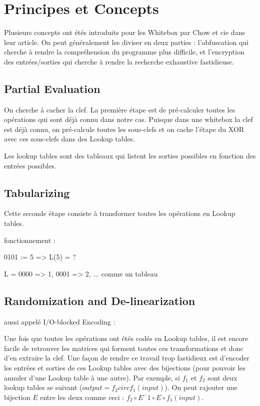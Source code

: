 \documentclass[a4paper,12pt]{article}
\begin{document}
\section{Principes et Concepts}

Plusieurs concepts ont étés introduits pour les Whitebox par Chow et cie dans leur article. On peut généralement les diviser en deux parties : l'obfuscation qui cherche à rendre la compréhension du programme plus difficile, et
 l'encryption des entrées/sorties qui cherche à rendre la recherche exhaustive fastidieuse.

\subsection{Partial Evaluation}

On cherche à cacher la clef. La première étape est de pré-calculer toutes les opérations qui sont déjà connu dans notre cas. Puisque dans une whitebox la clef est déjà connu, on pré-calcule toutes les sous-clefs et on cache l'étape du XOR avec ces sous-clefs dans des Lookup tables.

Les lookup tables sont des tableaux qui listent les sorties possibles en fonction des entrées possibles.

\subsection{Tabularizing}

Cette seconde étape consiste à transformer toutes les opérations en Lookup tables.

fonctionnement :

0101 := 5 => L(5) = ?

L = { 0000 => 1, 0001 => 2, ... } comme un tableau

\subsection{Randomization and De-linearization}

aussi appelé I/O-blocked Encoding :

Une fois que toutes les opérations ont étés codés en Lookup tables, il est encore facile de retrouver les matrices qui forment toutes ces transformations et donc d'en extraire la clef. Une façon de rendre ce travail trop fastidieux est d'encoder les entrées et sorties de ces Lookup tables avec des bijections (pour pouvoir les annuler d'une Lookup table à une autre).
Par exemple, si $f_1$ et $f_2$ sont deux lookup tables se suivant ($output = f_2 circ f_1(input)$). On peut rajouter une bijection $E$ entre les deux comme ceci : $f_2 \circ E^-1 \circ E \circ f_1(input)$.
\end{document}
